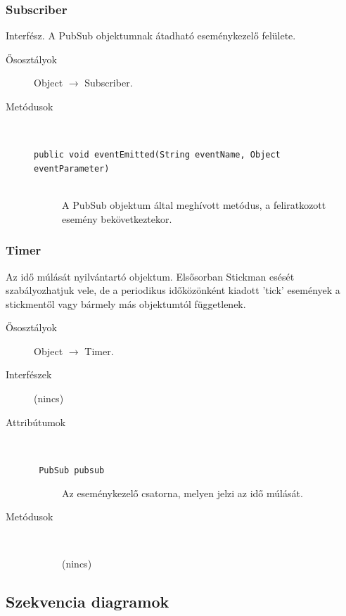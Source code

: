 		\subsubsection{Subscriber} Interfész.
				 A PubSub objektumnak átadható eseménykezelő felülete. 			\begin{description}


				\item[Ősosztályok] Object $\rightarrow{}$ Subscriber.
				\item[Metódusok]$\ $
					\begin{description}
						\item[\texttt{public void eventEmitted(String eventName, Object eventParameter)}] \hfill \\ A PubSub objektum által meghívott metódus,  a feliratkozott esemény bekövetkeztekor. 
					\end{description}
			\end{description}

		\subsubsection{Timer}
				 Az idő múlását nyilvántartó objektum.   Elsősorban Stickman esését szabályozhatjuk vele, de a  periodikus időközönként kiadott 'tick' események  a stickmentől vagy bármely más objektumtól függetlenek.  			\begin{description}


				\item[Ősosztályok] Object $\rightarrow{}$ Timer.
				\item[Interfészek] (nincs)
				\item[Attribútumok]$\ $
					\begin{description}
						\item[\texttt{ PubSub pubsub}] Az eseménykezelő csatorna,  melyen jelzi az idő múlását. 
					\end{description}
				\item[Metódusok]$\ $
					\begin{description}
						\item[] (nincs)
					\end{description}
			\end{description}

	
	\subsection{Szekvencia diagramok}
	
